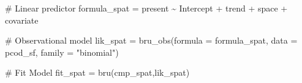\documentclass[
  letterpaper,
  DIV=11,
  numbers=noendperiod]{scrartcl}
\newenvironment{Shaded}{\begin{snugshade}}{\end{snugshade}}
\newcommand{\AttributeTok}[1]{\textcolor[rgb]{0.40,0.45,0.13}{#1}}
\newcommand{\CommentTok}[1]{\textcolor[rgb]{0.37,0.37,0.37}{#1}}
\newcommand{\FunctionTok}[1]{\textcolor[rgb]{0.28,0.35,0.67}{#1}}
\newcommand{\NormalTok}[1]{\textcolor[rgb]{0.00,0.23,0.31}{#1}}
\newcommand{\OtherTok}[1]{\textcolor[rgb]{0.00,0.23,0.31}{#1}}
\newcommand{\SpecialCharTok}[1]{\textcolor[rgb]{0.37,0.37,0.37}{#1}}
\newcommand{\StringTok}[1]{\textcolor[rgb]{0.13,0.47,0.30}{#1}}
\begin{document}
\begin{tcolorbox}
\begin{Shaded}
\begin{Highlighting}[]
\CommentTok{\# Linear predictor}
\NormalTok{formula\_spat }\OtherTok{=}\NormalTok{ present }\SpecialCharTok{\textasciitilde{}}\NormalTok{ Intercept  }\SpecialCharTok{+}\NormalTok{ trend }\SpecialCharTok{+}\NormalTok{ space }\SpecialCharTok{+}\NormalTok{ covariate}

\CommentTok{\# Observational model}
\NormalTok{lik\_spat }\OtherTok{=} \FunctionTok{bru\_obs}\NormalTok{(}\AttributeTok{formula =}\NormalTok{ formula\_spat, }
              \AttributeTok{data =}\NormalTok{ pcod\_sf, }
              \AttributeTok{family =} \StringTok{"binomial"}\NormalTok{)}

\CommentTok{\# Fit Model }
\NormalTok{fit\_spat }\OtherTok{=} \FunctionTok{bru}\NormalTok{(cmp\_spat,lik\_spat)}
\end{Highlighting}
\end{Shaded}

\end{tcolorbox}
\end{document}
